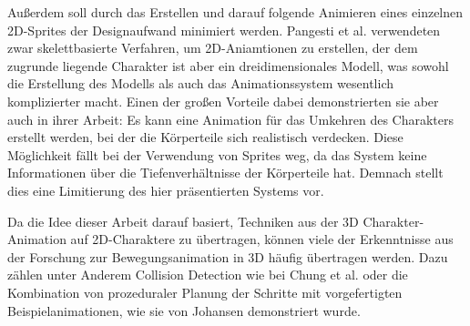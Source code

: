 Außerdem soll durch das Erstellen und darauf folgende Animieren eines einzelnen 2D-Sprites der Designaufwand minimiert werden. Pangesti et al.\cite{pangesti2019analysis} verwendeten zwar skelettbasierte Verfahren, um 2D-Aniamtionen zu erstellen, der dem zugrunde liegende Charakter ist aber ein dreidimensionales Modell, was sowohl die Erstellung des Modells als auch das Animationssystem wesentlich komplizierter macht. Einen der großen Vorteile dabei demonstrierten sie aber auch in ihrer Arbeit: Es kann eine Animation für das Umkehren des Charakters erstellt werden, bei der die Körperteile sich realistisch verdecken. Diese Möglichkeit fällt bei der Verwendung von Sprites weg, da das System keine Informationen über die Tiefenverhältnisse der Körperteile hat. Demnach stellt dies eine Limitierung des hier präsentierten Systems vor.

Da die Idee dieser Arbeit darauf basiert, Techniken aus der 3D Charakter-Animation auf 2D-Charaktere zu übertragen, können viele der Erkenntnisse aus der Forschung zur Bewegungsanimation in 3D häufig übertragen werden. Dazu zählen unter Anderem Collision Detection wie bei Chung et al.\cite{chung1999animation} oder die Kombination von prozeduraler Planung der Schritte mit vorgefertigten Beispielanimationen, wie sie von Johansen\cite{johansen2009automated} demonstriert wurde.
